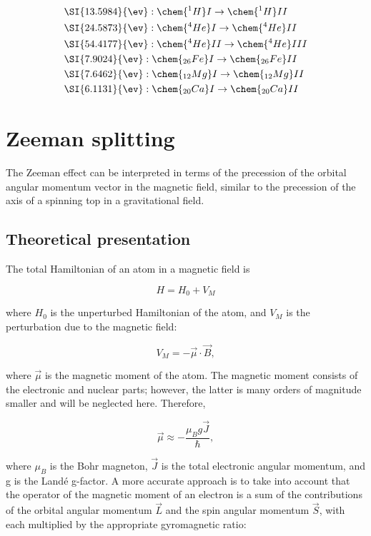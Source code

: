\begin{align*}
&\SI{13.5984}{\ev}:\chem{^1H}I\to\chem{^1H}II\\
&\SI{24.5873}{\ev}:\chem{^4He}I\to\chem{^4He}II\\
&\SI{54.4177}{\ev}:\chem{^4He}II\to\chem{^4He}III\\
&\SI{7.9024}{\ev}:\chem{_{26}Fe}I\to\chem{_{26}Fe}II\\
&\SI{7.6462}{\ev}:\chem{_{12}Mg}I\to\chem{_{12}Mg}II\\
&\SI{6.1131}{\ev}:\chem{_{20}Ca}I\to\chem{_{20}Ca}II
\end{align*}

\section{Zeeman splitting}

The Zeeman effect can be interpreted in terms of the precession of the orbital angular momentum vector in the magnetic field, similar to the precession of the axis of a spinning top in a gravitational field. 

\subsection{Theoretical presentation}

The total Hamiltonian of an atom in a magnetic field is

\begin{equation*}
H = H_0 + V_M
\end{equation*} 

where $H_0$ is the unperturbed Hamiltonian of the atom, and $V_M$ is the perturbation due to the magnetic field:

\begin{equation*}
V_M = -\vec{\mu} \cdot \vec{B},
\end{equation*}

where $\vec{\mu}$ is the magnetic moment of the atom. The magnetic moment consists of the electronic and nuclear parts; however, the latter is many orders of magnitude smaller and will be neglected here. Therefore,

\begin{equation*}
\vec{\mu} \approx -\frac{\mu_B g \vec{J}}{\hbar},
\end{equation*}

where $\mu_B$ is the Bohr magneton, $\vec{J}$ is the total electronic angular momentum, and g is the Land\'e g-factor. A more accurate approach is to take into account that the operator of the magnetic moment of an electron is a sum of the contributions of the orbital angular momentum $\vec{L}$ and the spin angular momentum $\vec{S}$, with each multiplied by the appropriate gyromagnetic ratio:

